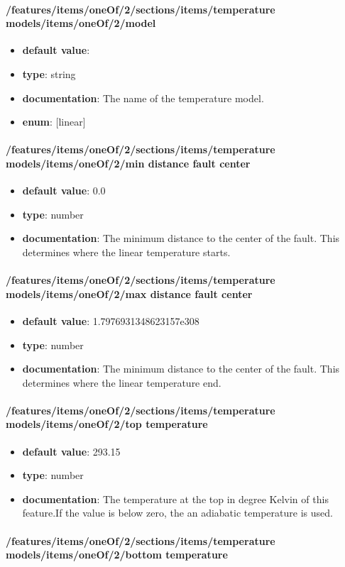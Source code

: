 \paragraph{/features/items/oneOf/2/sections/items/temperature models/items/oneOf/2/model}
\begin{itemize}\item {\bf default value}: 
\item {\bf type}: string
\item {\bf documentation}: The name of the temperature model.
\item {\bf enum}: [linear]\end{itemize}\paragraph{/features/items/oneOf/2/sections/items/temperature models/items/oneOf/2/min distance fault center}
\begin{itemize}\item {\bf default value}: 0.0
\item {\bf type}: number
\item {\bf documentation}: The minimum distance to the center of the fault. This determines where the linear temperature starts.
\end{itemize}\paragraph{/features/items/oneOf/2/sections/items/temperature models/items/oneOf/2/max distance fault center}
\begin{itemize}\item {\bf default value}: 1.7976931348623157e308
\item {\bf type}: number
\item {\bf documentation}: The minimum distance to the center of the fault. This determines where the linear temperature end.
\end{itemize}\paragraph{/features/items/oneOf/2/sections/items/temperature models/items/oneOf/2/top temperature}
\begin{itemize}\item {\bf default value}: 293.15
\item {\bf type}: number
\item {\bf documentation}: The temperature at the top in degree Kelvin of this feature.If the value is below zero, the an adiabatic temperature is used.
\end{itemize}\paragraph{/features/items/oneOf/2/sections/items/temperature models/items/oneOf/2/bottom temperature}
